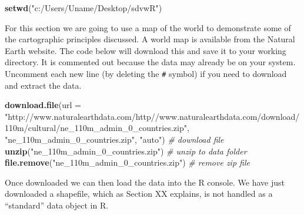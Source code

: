 \documentclass[]{article}
\newenvironment{Shaded}{}{}
\newcommand{\KeywordTok}[1]{\textcolor[rgb]{0.00,0.44,0.13}{\textbf{{#1}}}}
\newcommand{\DataTypeTok}[1]{\textcolor[rgb]{0.56,0.13,0.00}{{#1}}}
\newcommand{\StringTok}[1]{\textcolor[rgb]{0.25,0.44,0.63}{{#1}}}
\newcommand{\CommentTok}[1]{\textcolor[rgb]{0.38,0.63,0.69}{\textit{{#1}}}}
\newcommand{\NormalTok}[1]{{#1}}
\begin{document}
\begin{Shaded}
\begin{Highlighting}[]
\KeywordTok{setwd}\NormalTok{(}\StringTok{"c:/Users/Uname/Desktop/sdvwR"}\NormalTok{)}
\end{Highlighting}
\end{Shaded}
For this section we are going to use a map of the world to demonstrate
some of the cartographic principles discussed. A world map is available
from the Natural Earth website. The code below will download this and
save it to your working directory. It is commented out because the data
may already be on your system. Uncomment each new line (by deleting the
\texttt{\#} symbol) if you need to download and extract the data.

\begin{Shaded}
\begin{Highlighting}[]
\KeywordTok{download.file}\NormalTok{(}\DataTypeTok{url =} \StringTok{"http://www.naturalearthdata.com/http//www.naturalearthdata.com/download/110m/cultural/ne_110m_admin_0_countries.zip"}\NormalTok{, }
    \StringTok{"ne_110m_admin_0_countries.zip"}\NormalTok{, }\StringTok{"auto"}\NormalTok{)  }\CommentTok{# download file}
\KeywordTok{unzip}\NormalTok{(}\StringTok{"ne_110m_admin_0_countries.zip"}\NormalTok{)  }\CommentTok{# unzip to data folder}
\KeywordTok{file.remove}\NormalTok{(}\StringTok{"ne_110m_admin_0_countries.zip"}\NormalTok{)  }\CommentTok{# remove zip file}
\end{Highlighting}
\end{Shaded}
Once downloaded we can then load the data into the R console. We have
just downloaded a shapefile, which as Section XX explains, is not
handled as a ``standard'' data object in R.
\end{document}
